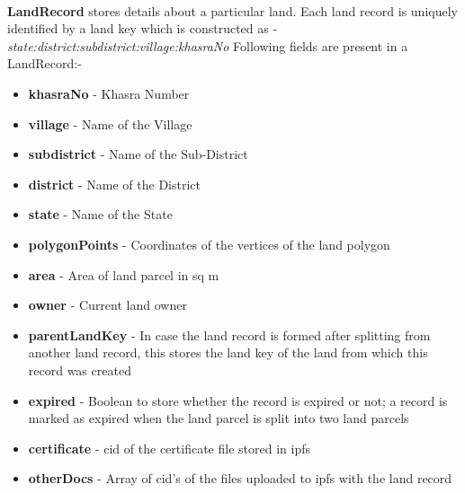 \documentclass[12pt]{article}
\begin{document}
        \paragraph{}
        \textbf{LandRecord} stores details about a particular land. Each land record is uniquely identified by a land key which is constructed as - 
        \textit{state:district:subdistrict:village:khasraNo}
        Following fields are present in a LandRecord:-
        \begin{itemize}
            \item \textbf{khasraNo} - Khasra Number
            \item \textbf{village} - Name of the Village
            \item \textbf{subdistrict} - Name of the Sub-District
            \item \textbf{district} - Name of the District
            \item \textbf{state} - Name of the State
            \item \textbf{polygonPoints} - Coordinates of the vertices of the land polygon
            \item \textbf{area} - Area of land parcel in sq m
            \item \textbf{owner} - Current land owner
            \item \textbf{parentLandKey} - In case the land record is formed after splitting from another land record, this stores the land key of the land from which this record was created
            \item \textbf{expired} - Boolean to store whether the record is expired or not; a record is marked as expired when the land parcel is split into two land parcels
            \item \textbf{certificate} - \acrshort{cid} of the certificate file stored in \acrshort{ipfs}
            \item \textbf{otherDocs} - Array of \acrshort{cid}'s of the files uploaded to \acrshort{ipfs} with the land record
        \end{itemize}
\end{document}
